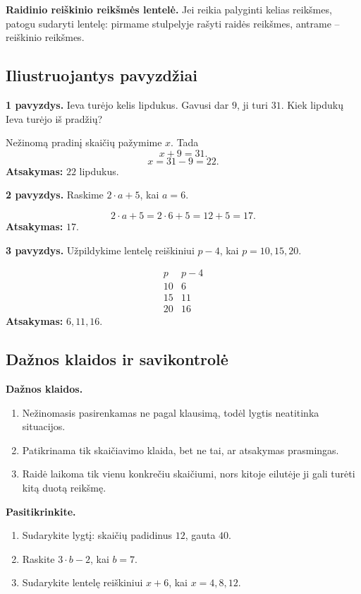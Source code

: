 \textbf{Raidinio reiškinio reikšmės lentelė.}
Jei reikia palyginti kelias reikšmes, patogu sudaryti lentelę: pirmame stulpelyje rašyti raidės reikšmes, antrame -- reiškinio reikšmes.

\subsection{Iliustruojantys pavyzdžiai}

\textbf{1 pavyzdys.} Ieva turėjo kelis lipdukus. Gavusi dar \(9\), ji turi \(31\). Kiek lipdukų Ieva turėjo iš pradžių?

Nežinomą pradinį skaičių pažymime \(x\). Tada
\[
x+9=31.
\]
\[
x=31-9=22.
\]
\textbf{Atsakymas:} \(22\) lipdukus.

\textbf{2 pavyzdys.} Raskime \(2\cdot a+5\), kai \(a=6\).

\[
2\cdot a+5=2\cdot6+5=12+5=17.
\]
\textbf{Atsakymas:} \(17\).

\textbf{3 pavyzdys.} Užpildykime lentelę reiškiniui \(p-4\), kai \(p=10,15,20\).

\[
\begin{array}{c|c}
p & p-4\\ \hline
10 & 6\\
15 & 11\\
20 & 16
\end{array}
\]
\textbf{Atsakymas:} \(6,11,16\).

\subsection{Dažnos klaidos ir savikontrolė}

\textbf{Dažnos klaidos.}
\begin{enumerate}[label=\arabic*.]
\item Nežinomasis pasirenkamas ne pagal klausimą, todėl lygtis neatitinka situacijos.
\item Patikrinama tik skaičiavimo klaida, bet ne tai, ar atsakymas prasmingas.
\item Raidė laikoma tik vienu konkrečiu skaičiumi, nors kitoje eilutėje ji gali turėti kitą duotą reikšmę.
\end{enumerate}

\textbf{Pasitikrinkite.}
\begin{enumerate}[label=\arabic*.]
\item Sudarykite lygtį: skaičių padidinus \(12\), gauta \(40\).
\item Raskite \(3\cdot b-2\), kai \(b=7\).
\item Sudarykite lentelę reiškiniui \(x+6\), kai \(x=4,8,12\).
\end{enumerate}

